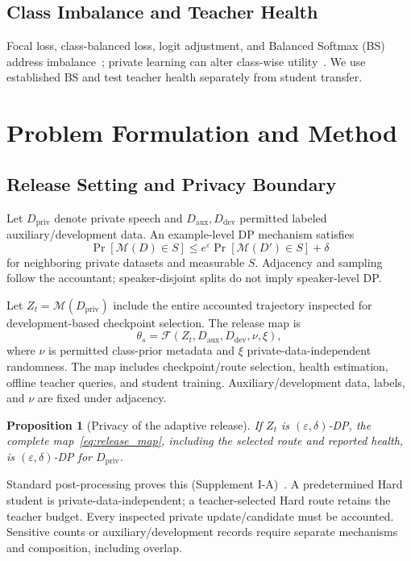 \documentclass[journal]{IEEEtran}
\theoremstyle{definition}
\theoremstyle{plain}
\newtheorem{proposition}{Proposition}
\begin{document}
\subsection{Class Imbalance and Teacher Health}
Focal loss, class-balanced loss, logit adjustment, and Balanced Softmax (BS) address imbalance~\cite{lin2017focal,cui2019classbalanced,menon2021longtail,ren2020balanced}; private learning can alter class-wise utility~\cite{bagdasaryan2019dpimpact,tran2021dpimbalance,ganev2022robinhood}. We use established BS and test teacher health separately from student transfer.

\section{Problem Formulation and Method}
\label{sec:method}
\subsection{Release Setting and Privacy Boundary}
\label{sec:release_private_learning}
Let $D_{\mathrm{priv}}$ denote private speech and $D_{\mathrm{aux}},D_{\mathrm{dev}}$ permitted labeled auxiliary/development data. An example-level DP mechanism satisfies
\begin{equation}
\Pr[\mathcal M(D)\in S]\le e^\varepsilon\Pr[\mathcal M(D')\in S]+\delta
\label{eq:dp}
\end{equation}
for neighboring private datasets and measurable $S$. Adjacency and sampling follow the accountant; speaker-disjoint splits do not imply speaker-level DP.

Let $Z_t=\mathcal M(D_{\mathrm{priv}})$ include the entire accounted trajectory inspected for development-based checkpoint selection. The release map is
\begin{equation}
\theta_s=\mathcal F(Z_t,D_{\mathrm{aux}},D_{\mathrm{dev}},\nu,\xi),
\label{eq:release_map}
\end{equation}
where $\nu$ is permitted class-prior metadata and $\xi$ private-data-independent randomness. The map includes checkpoint/route selection, health estimation, offline teacher queries, and student training. Auxiliary/development data, labels, and $\nu$ are fixed under adjacency.

\begin{proposition}[Privacy of the adaptive release]
\label{thm:student_privacy}
If $Z_t$ is $(\varepsilon,\delta)$-DP, the complete map~\eqref{eq:release_map}, including the selected route and reported health, is $(\varepsilon,\delta)$-DP for $D_{\mathrm{priv}}$.
\end{proposition}
Standard post-processing proves this (Supplement I-A)~\cite{dwork2014}. A predetermined Hard student is private-data-independent; a teacher-selected Hard route retains the teacher budget. Every inspected private update/candidate must be accounted. Sensitive counts or auxiliary/development records require separate mechanisms and composition, including overlap.
\end{document}
